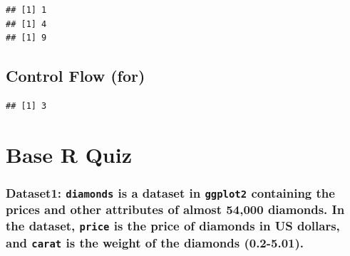 \documentclass[]{book}
\newenvironment{Shaded}{\begin{snugshade}}{\end{snugshade}}
\newcommand{\CommentTok}[1]{\textcolor[rgb]{0.56,0.35,0.01}{\textit{#1}}}
\newcommand{\ControlFlowTok}[1]{\textcolor[rgb]{0.13,0.29,0.53}{\textbf{#1}}}
\newcommand{\DecValTok}[1]{\textcolor[rgb]{0.00,0.00,0.81}{#1}}
\newcommand{\KeywordTok}[1]{\textcolor[rgb]{0.13,0.29,0.53}{\textbf{#1}}}
\newcommand{\NormalTok}[1]{#1}
\newcommand{\OperatorTok}[1]{\textcolor[rgb]{0.81,0.36,0.00}{\textbf{#1}}}
\newcommand{\StringTok}[1]{\textcolor[rgb]{0.31,0.60,0.02}{#1}}
\begin{document}
\begin{verbatim}
## [1] 1
## [1] 4
## [1] 9
\end{verbatim}

\hypertarget{control-flow-for-1}{%
\section{Control Flow (for)}\label{control-flow-for-1}}

\begin{Shaded}
\end{Shaded}

\begin{verbatim}
## [1] 3
\end{verbatim}

\hypertarget{base-r-quiz}{%
\chapter{Base R Quiz}\label{base-r-quiz}}

\hypertarget{dataset1-diamonds-is-a-dataset-in-ggplot2-containing-the-prices-and-other-attributes-of-almost-54000-diamonds.-in-the-dataset-price-is-the-price-of-diamonds-in-us-dollars-and-carat-is-the-weight-of-the-diamonds-0.2-5.01.}{%
\subsection{\texorpdfstring{Dataset1: \texttt{diamonds} is a dataset in \texttt{ggplot2} containing the prices and other attributes of almost 54,000 diamonds. In the dataset, \texttt{price} is the price of diamonds in US dollars, and \texttt{carat} is the weight of the diamonds (0.2-5.01).}{Dataset1: diamonds is a dataset in ggplot2 containing the prices and other attributes of almost 54,000 diamonds. In the dataset, price is the price of diamonds in US dollars, and carat is the weight of the diamonds (0.2-5.01).}}\label{dataset1-diamonds-is-a-dataset-in-ggplot2-containing-the-prices-and-other-attributes-of-almost-54000-diamonds.-in-the-dataset-price-is-the-price-of-diamonds-in-us-dollars-and-carat-is-the-weight-of-the-diamonds-0.2-5.01.}}
\end{document}

